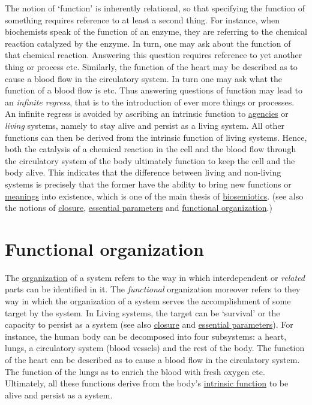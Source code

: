 \documentclass[12pt]{article}
\begin{document}
The notion of `function' is inherently relational, so that specifying
the function of something requires reference to at least a second
thing. For instance, when biochemists speak of the function of an
enzyme, they are referring to the chemical reaction catalyzed by the
enzyme. In turn, one may ask about the function of that chemical
reaction. Answering this question requires reference to yet another
thing or process etc. Similarly, the function of the heart may be
described as to cause a blood flow in the circulatory system. In turn
one may ask what the function of a blood flow is etc. Thus answering
questions of function may lead to an {\em infinite regress}, that is
to the introduction of ever more things or processes. An infinite
regress is avoided by ascribing an intrinsic function to
\hyperlink{agent}{agencies} or {\em living} systems, namely to stay
alive and persist as a living system. All other functions can then be
derived from the intrinsic function of living systems. Hence, both the
catalysis of a chemical reaction in the cell and the blood flow
through the circulatory system of the body ultimately function to keep
the cell and the body alive. This indicates that the difference
between living and non-living systems is precisely that the former
have the ability to bring new functions or \hyperlink{meaning}{meanings} into existence,
which is one of the main thesis of
\hyperlink{biosemiotics}{biosemiotics}.  (see also the notions of
\hyperlink{closure}{closure},
\hyperlink{essential_parameters}{essential parameters} and
\hyperlink{functional_organization}{functional organization}.)

\hypertarget{functional_organization}{}
\section{Functional organization} 

The \hyperlink{organization}{organization} of a system refers to the
way in which interdependent or {\em related} parts can be identified
in it. The {\em functional} organization moreover refers to they way
in which the organization of a system serves the accomplishment of
some target by the system. In Living systems, the target can be
`survival' or the capacity to persist as a system (see also
\hyperlink{closure}{closure} and
\hyperlink{essential_parameters}{essential parameters}). For instance,
the human body can be decomposed into four subsystems: a heart, lungs,
a circulatory system (blood vessels) and the rest of the body. The
function of the heart can be described as to cause a blood flow in the
circulatory system. The function of the lungs as to enrich the blood
with fresh oxygen etc. Ultimately, all these functions derive from the
body's \hyperlink{function}{intrinsic function} to be alive and
persist as a system.
\end{document}
